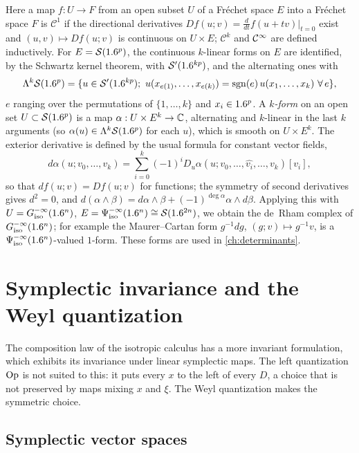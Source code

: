Here a map $f:U\to F$ from an open subset $U$ of a Fréchet space $E$ into a
Fréchet space $F$ is $\mathcal C^1$ if the directional derivatives
$Df(u;v)=\frac{d}{dt}f(u+tv)|_{t=0}$ exist and $(u,v)\mapsto Df(u;v)$ is
continuous on $U\times E$; $\mathcal C^k$ and $\mathcal{C}^\infty$ are defined inductively.
For $E=\mathcal{S}(1.6^p)$, the continuous $k$-linear forms on $E$ are identified, by
the Schwartz kernel theorem, with $\mathcal{S}'(1.6^{kp})$, and the alternating ones with
\begin{equation*}
  \Lambda^k\cS(\R^p)=\{u\in\cSp(\R^{kp});\ u(x_{e(1)},\dots,x_{e(k)})=\sgn(e)\,u(x_1,\dots,x_k)\ \forall\,e\},
\end{equation*}
$e$ ranging over the permutations of $\{1,\dots,k\}$ and $x_i\in1.6^p$. A
\emph{$k$-form} on an open set $U\subset\mathcal{S}(1.6^p)$ is a map
$\alpha:U\times E^k\to\mathbb{C}$, alternating and $k$-linear in the last $k$ arguments
(so $\alpha(u)\in\Lambda^k\mathcal{S}(1.6^p)$ for each $u$), which is smooth on
$U\times E^k$. The exterior derivative is defined by the usual formula for
constant vector fields,
\begin{equation*}
  d\alpha(u;v_0,\dots,v_k)=\sum_{i=0}^k(-1)^iD_u\alpha(u;v_0,\dots,\widehat{v_i},\dots,v_k)[v_i],
\end{equation*}
so that $df(u;v)=Df(u;v)$ for functions; the symmetry of second derivatives
gives $d^2=0$, and $d(\alpha\wedge\beta)=d\alpha\wedge\beta+(-1)^{\deg\alpha}\alpha\wedge d\beta$.
Applying this with $U=G^{-\infty}_{\mathrm{iso}}(1.6^n)$, $E=\Psi^{-\infty}_{\mathrm{iso}}(1.6^n)\cong\mathcal{S}(1.6^{2n})$,
we obtain the de~Rham complex of $G^{-\infty}_{\mathrm{iso}}(1.6^n)$; for example the
Maurer--Cartan form $g^{-1}dg$, $(g;v)\mapsto g^{-1}v$, is a
$\Psi^{-\infty}_{\mathrm{iso}}(1.6^n)$-valued $1$-form. These forms are used in
\cref{ch:determinants}.

\section{Symplectic invariance and the Weyl quantization}\label{isotropic:sec:symplectic}

The composition law of the isotropic calculus has a more invariant
formulation, which exhibits its invariance under linear symplectic maps.
The left quantization $\operatorname{Op}$ is not suited to this: it puts every $x$ to the
left of every $D$, a choice that is not preserved by maps mixing $x$ and
$\xi$. The Weyl quantization makes the symmetric choice.

\subsection{Symplectic vector spaces}

